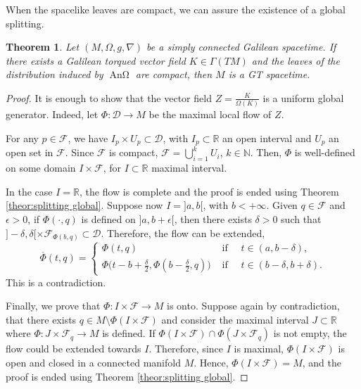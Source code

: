\documentclass[12pt]{article}
\newcommand{\spacetime}{(M,\Omega,g,\nabla)}
\DeclareMathOperator{\An}{\text{An}\Omega}
\newtheorem{theor}[defi]{Theorem}
\def\R{\mathbb R}
\def\f{\mathcal F}
\begin{document}
When the spacelike leaves are compact, we can assure the existence of a  global splitting.
\begin{theor}\label{theor:splitting global compact}
    Let $\spacetime$ be a simply connected Galilean spacetime. If there exists a Galilean torqued vector field $K\in \Gamma(TM)$ and the leaves of the distribution induced by $\An$ are compact, then $M$ is a GT spacetime. 
\end{theor}
\begin{proof}
    It is enough to show that the vector field $Z=\frac{K}{\Omega(K)}$ is a uniform global generator. Indeed, let $\Phi\colon \mathcal{D} \to M$ be the maximal local flow of $Z$. 
    
    For any $p\in \f$, we have $I_p\times U_p\subset \mathcal{D}$, with $I_p\subset \R$ an open interval and $U_p$ an open set in $\f$. Since $\f$ is compact, $\f = \bigcup_{i=1}^k U_i$, $k\in \mathbb{N}$. Then, $\Phi$ is well-defined on some domain $I\times \f$, for $I\subset \R$ maximal interval. 
    
    In the case $I=\R$, the flow is complete and the proof is ended using Theorem \ref{theor:splitting global}. Suppose now $I=]a,b[$, with $b<+\infty$. Given $q\in \f$ and $\epsilon>0$, if $\Phi(\cdot, q)$ is defined on $]a,b+\epsilon[$, then there exists $\delta>0$ such that $]-\delta, \delta[ \times \f_{\Phi(b,q)}\subset \mathcal{D}$. Therefore, the flow can be extended, 
    \begin{equation*}
        \overline{\Phi}(t, q)=\left\{\begin{array}{lcc}
        \Phi(t, q) & \text { if } \quad t \in(a, b-\delta), \\
        \Phi\big(t-b+\tfrac{\delta}{2}, \Phi(b-\tfrac{\delta}{2}, q)\big) & \text { if } \quad t \in(b-\delta, b+\delta) .
        \end{array}\right.
    \end{equation*}
    This is a contradiction.
        
    Finally, we prove that $\Phi\colon I\times \f\to M$ is onto. Suppose again by contradiction, that there exists $q\in M\setminus \Phi(I\times \f)$ and consider the maximal interval $J\subset \R$ where $\Phi\colon J\times \f_q\to M$ is defined. If $\Phi(I\times \f) \cap \Phi(J\times \f_q)$ is not empty, the flow could be extended towards $I$. Therefore, since $I$ is maximal, $\Phi(I\times \f)$ is open and closed in a connected manifold $M$. Hence, $\Phi(I\times \f)=M$, and the proof is ended using Theorem \ref{theor:splitting global}.
\end{proof}
\end{document}
